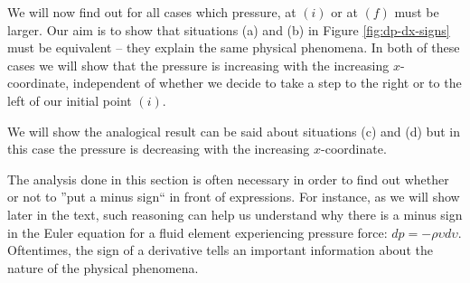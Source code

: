 We will now find out for all cases which pressure, at \textcolor{myblue}{$(i)$} or at \textcolor{myblue}{$(f)$} must be larger. Our aim is to show that situations (a) and (b) in Figure \ref{fig:dp-dx-signs} must be equivalent -- they explain the same physical phenomena. In both of these cases we will show that the pressure is increasing with the increasing $x$-coordinate, independent of whether we decide to take a step to the right or to the left of our initial point \textcolor{myblue}{$(i)$}. 

We will show the analogical result can be said about situations (c) and (d) but in this case the pressure is decreasing with the increasing $x$-coordinate.

The analysis done in this section is often necessary in order to find out whether or not to ''put a minus sign`` in front of expressions. For instance, as we will show later in the text, such reasoning can help us understand why there is a minus sign in the Euler equation for a fluid element experiencing pressure force: $dp = - \rho \upsilon d \upsilon$. Oftentimes, the sign of a derivative tells an important information about the nature of the physical phenomena.

